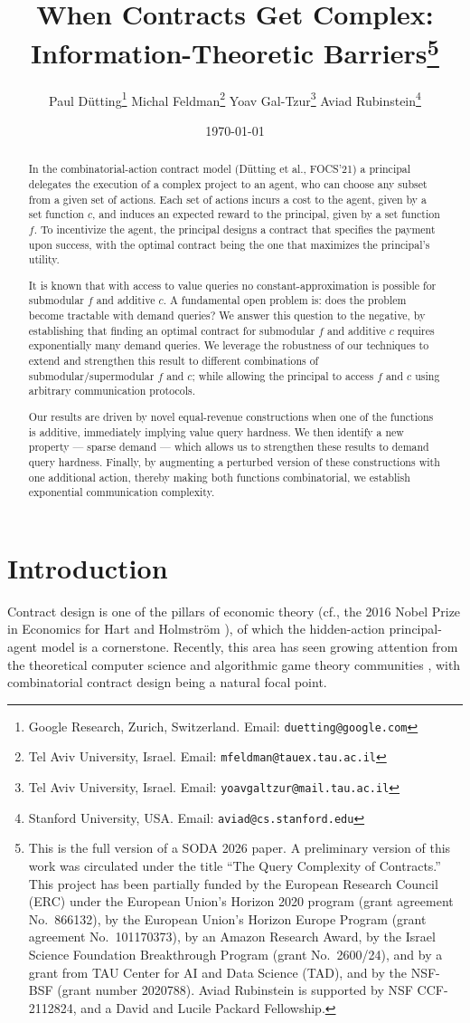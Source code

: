 \documentclass[11pt]{article}
\author{
Paul Dütting\thanks{Google Research, Zurich, Switzerland. Email: \texttt{duetting@google.com}} 
\;\;\;\; Michal Feldman\thanks{Tel Aviv University, Israel. Email: \texttt{mfeldman@tauex.tau.ac.il}}
\;\;\;\; Yoav Gal-Tzur\thanks{Tel Aviv University, Israel. Email: \texttt{yoavgaltzur@mail.tau.ac.il}}
\;\;\;\; Aviad Rubinstein\thanks{Stanford University, USA. Email: \texttt{aviad@cs.stanford.edu}}
}
\date{\today}
\title{
When Contracts Get Complex: Information-Theoretic Barriers\thanks{This is the full version of a SODA 2026 paper. A preliminary version of this work was circulated under the title ``The Query Complexity of Contracts.''
This project has been partially funded by the European Research Council (ERC) under the European Union's Horizon 2020 program (grant agreement No.~866132), by the European Union's Horizon Europe Program (grant agreement No.~101170373), by an Amazon Research Award, by the Israel Science Foundation Breakthrough Program (grant No.~2600/24), and by a grant from TAU Center for AI and Data Science (TAD), and by the NSF-BSF (grant number 2020788).
Aviad Rubinstein is supported by NSF CCF-2112824, and a David and Lucile Packard Fellowship.}
}
\begin{document}
\maketitle

\begin{abstract}
In the combinatorial-action contract model (D\"utting et al., FOCS'21) 
a principal delegates the execution of a complex project to an agent, who can choose any subset from a given set of actions.
Each set of actions incurs a cost to the agent,
given by a set function $c$, and induces an expected reward to the principal, given by a set function $f$. 
To incentivize the agent, the principal designs a contract that specifies the payment upon success, with the optimal contract being the one that maximizes the principal's utility.

It is known that with access to value queries no constant-approximation is possible for submodular $f$ and additive $c$. A fundamental open problem is: does the problem become tractable with demand queries?
We answer this question to the negative, by establishing that finding an optimal contract for submodular $f$ and additive $c$ requires exponentially many demand queries. 
We leverage the robustness of our techniques to extend and strengthen this result to different combinations of submodular/supermodular $f$ and $c$; 
while allowing the principal to access $f$ and $c$ using arbitrary communication protocols.

Our results are driven by novel equal-revenue constructions when one of the functions is additive, immediately implying value query hardness. 
We then identify a new property --- sparse demand --- which allows us to strengthen these results to demand query hardness.
Finally, by augmenting a perturbed version of these constructions with one additional action, thereby making both functions combinatorial, we establish exponential communication complexity.  
\end{abstract}

\section{Introduction}

Contract design is one of the pillars of economic theory (cf., the 2016 Nobel Prize in Economics for Hart and Holmström \cite{Nobel2016}), of which the hidden-action principal-agent model is a cornerstone.
Recently, this area has seen growing attention from the theoretical computer science and algorithmic game theory communities \cite{contractsSurvey}, with combinatorial contract design being a natural focal point.
\end{document}
